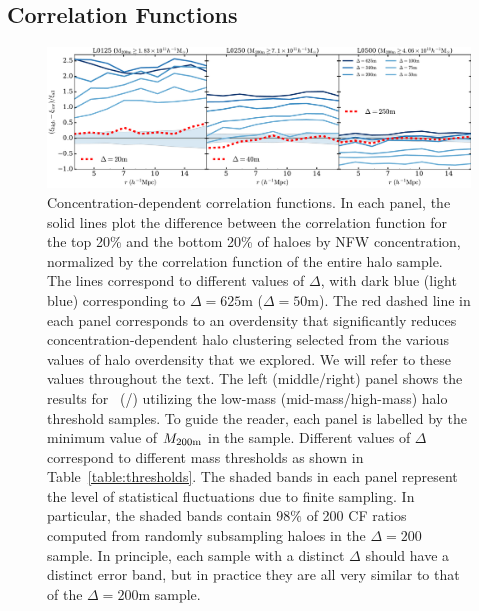 \documentclass[usenatbib,fleqn]{mnras}
\begin{document}
\subsection{Correlation Functions}
\label{sub:cfresults}


\begin{figure}
	\centering
	\includegraphics[width=\textwidth]{all_cfcompare_cnfw.pdf}
	\caption{
Concentration-dependent correlation functions. In each panel, the solid lines plot the difference between the correlation function for the top 20\% and the bottom 20\% of haloes by NFW concentration, normalized by the correlation function of the entire halo sample. The lines correspond to different values of $\Delta$, with dark blue (light blue) corresponding to $\Delta = 625$m ($\Delta = 50$m). The red dashed line in each panel  corresponds to an overdensity that significantly reduces concentration-dependent halo clustering selected from the various values of halo overdensity that we explored. We will refer to these values throughout the text. The left (middle/right) panel shows the results for \simA \ (\simB /\simC) utilizing the low-mass (mid-mass/high-mass) halo threshold samples. To guide the reader, each panel is labelled by the minimum value of $M_{200{\rm m}}$ in the sample. Different values of $\Delta$ correspond to different mass thresholds as shown in Table~\ref{table:thresholds}. The shaded bands in each panel represent the level of statistical fluctuations due to finite sampling. In particular, the shaded bands contain $98\%$ of 200 CF ratios computed from randomly subsampling haloes in the $\Delta=200$ sample. In principle, each sample with a distinct $\Delta$ should have a distinct error band, but in practice they are all very similar to that of the $\Delta=200$m sample.
}
\label{fig:cc_cfcompare}
\end{figure}
\end{document}
